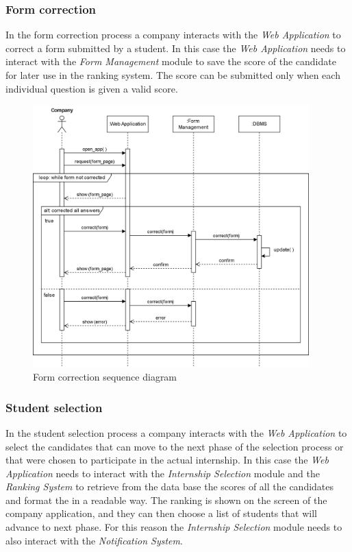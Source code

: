 \documentclass[11pt,twoside]{article}
\begin{document}
\newpage

		\subsubsection{Form correction}
In the form correction process a company interacts with the \textit{Web Application} to correct a form submitted by a student. In this case the \textit{Web Application} needs to interact with the \textit{Form Management} module to save the score of the candidate for later use in the ranking system. The score can be submitted only when each individual question is given a valid score.

\begin{figure}[H]
\centering
\includegraphics[width=0.95\textwidth]{Images/Seq7}
\caption{Form correction sequence diagram}\label{Seq7}
\end{figure}

\newpage

		\subsubsection{Student selection}
In the student selection process a company interacts with the \textit{Web Application} to select the candidates that can move to the next phase of the selection process or that were chosen to participate in the actual internship. In this case the \textit{Web Application} needs to interact with the \textit{Internship Selection} module and the \textit{Ranking System} to retrieve from the data base the scores of all the candidates and format the in a readable way. The ranking is shown on the screen of the company application, and they can then choose a list of students that will advance to next phase. For this reason the \textit{Internship Selection} module needs to also interact with the \textit{Notification System}.
\end{document}
